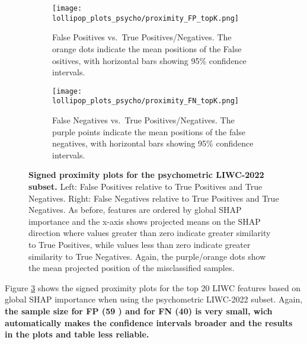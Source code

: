 \begin{figure}[H]
  \centering

  \begin{subfigure}[t]{0.49\textwidth}
    \centering
    \texttt{[image: lollipop\_plots\_psycho/proximity\_FP\_topK.png]}
    \caption{False Positives vs.\ True Positives/Negatives. The \textcolor{orange!70!black}{orange} dots indicate the mean positions of the False ositives, with horizontal bars showing 95\% confidence intervals.}
    \label{fig:lollipop_fp_psycho}
  \end{subfigure}\hfill
  \begin{subfigure}[t]{0.49\textwidth}
    \centering
    \texttt{[image: lollipop\_plots\_psycho/proximity\_FN\_topK.png]}
    \caption{False Negatives vs.\ True Positives/Negatives. The \textcolor{purple!70!black}{purple points} indicate the mean positions of the false negatives, with horizontal bars showing 95\% confidence intervals.}
    \label{fig:lollipop_fn_psycho}
  \end{subfigure}

  \caption[Signed proximity plots for the psychometric LIWC-2022 subset.]{\textbf{Signed proximity plots for the psychometric LIWC-2022 subset.} 
  Left: False Positives relative to True Positives and True Negatives. 
  Right: False Negatives relative to True Positives and True Negatives. 
  As before, features are ordered by global SHAP importance and the x-axis shows projected means on the SHAP direction where values greater than zero indicate greater similarity to True Positives, while values less than zero indicate greater similarity to True Negatives. Again, the purple/orange dots show the mean projected position of the misclassified samples.}
  \label{fig:lollipop_psycho}
\end{figure}

Figure \ref{fig:lollipop_psycho} shows the signed proximity plots for the top 20 LIWC features based on global SHAP importance when using the psychometric LIWC-2022 subset. Again, \textbf{the sample size for FP (59 ) and for FN (40) is very small, wich automatically makes the confidence intervals broader and the results in the plots and table less reliable.} 

